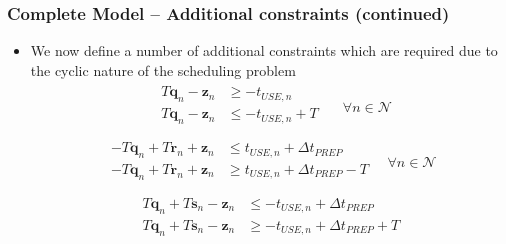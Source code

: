 \documentclass{beamer}
\begin{document}
\begin{frame}
    \frametitle{Complete Model -- Additional constraints (continued)}
    \begin{itemize}
        \item We now define a number of additional constraints which are
        required due to the cyclic nature of the scheduling problem
        \begin{equation}
            \begin{split}
                \begin{alignedat}{2}
                    T \boldsymbol{q}_{n} - \boldsymbol{z}_{n} &\ge
                    - t_{\mathit{USE},n}\\
                    T \boldsymbol{q}_{n} - \boldsymbol{z}_{n} &\le
                    - t_{\mathit{USE},n} + T\\
                \end{alignedat}
            \end{split}
            \quad \forall n \in \mathcal{N}
        \end{equation}
        \begin{equation}
            \begin{split}
                \begin{alignedat}{2}
                    - T \boldsymbol{q}_{n} + T \boldsymbol{r}_{n} 
                    + \boldsymbol{z}_{n}
                    &\le t_{\mathit{USE},n} + \Delta t_{\mathit{PREP}}\\
                    - T \boldsymbol{q}_{n} + T \boldsymbol{r}_{n}
                    + \boldsymbol{z}_{n}
                    &\ge t_{\mathit{USE},n} + \Delta t_{\mathit{PREP}} - T\\
                    \end{alignedat}
                \quad \forall n \in \mathcal{N}
            \end{split}
        \end{equation}
        \begin{equation}
            \begin{split}
                \begin{alignedat}{2}
                    T \boldsymbol{q}_{n} + T \boldsymbol{s}_{n} 
                    - \boldsymbol{z}_{n}
                    &\le -t_{\mathit{USE},n} + \Delta t_{\mathit{PREP}}\\
                    T \boldsymbol{q}_{n} + T \boldsymbol{s}_{n} 
                    - \boldsymbol{z}_{n}
                    &\ge -t_{\mathit{USE},n} + \Delta t_{\mathit{PREP}} + T\\

\end{alignedat}
\end{split}
\end{equation}
\end{itemize}
\end{frame}
\end{document}
